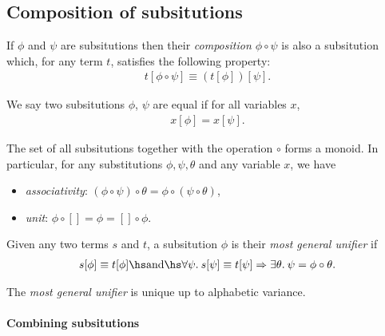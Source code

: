 \documentclass{article}
\begin{document}
\subsection{Composition of subsitutions}

\begin{definition}
	If $\phi$ and $\psi$ are subsitutions then their \emph{composition $\phi\circ\psi$}
	is also a subsitution which, for any term $t$, satisfies the following property:
	\begin{align*}
		t[\phi\circ\psi] \equiv (t[\phi])[\psi].
	\end{align*}
\end{definition}

\begin{definition}
	We say two subsitutions $\phi$, $\psi$ are equal if for all variables $x$,
	\begin{align*}
		x[\phi] = x[\psi].
	\end{align*}
\end{definition}

\begin{theorem}
	The set of all subsitutions together with the operation $\circ$ forms a monoid. In particular,
	for any substitutions $\phi,\psi,\theta$ and any variable $x$, we have
	\begin{itemize}
		\item \emph{associativity}: $(\phi \circ \psi) \circ \theta = \phi \circ (\psi \circ \theta)$,
		\item \emph{unit}: $\phi\circ[] = \phi = []\circ\phi$.
	\end{itemize}
\end{theorem}

\begin{definition}
	Given any two terms $s$ and $t$, a subsitution $\phi$ is their \emph{most general unifier}
	if
	\begin{align*}
		s[\phi]\equiv t[\phi] \hs\text{and}\hs
		\forall \psi.\: s[\psi] \equiv t[\psi]  \Rightarrow \exists \theta.\: \psi = \phi \circ \theta.
	\end{align*}
\end{definition}

\begin{theorem}
	The \emph{most general unifier} is unique up to alphabetic variance.
\end{theorem}

\paragraph{Combining subsitutions}
\end{document}
